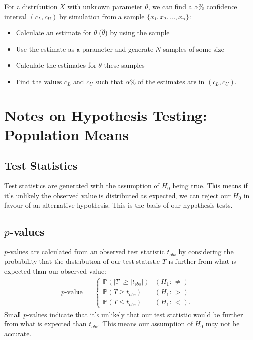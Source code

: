 \documentclass[a4paper, 12pt, twoside]{article}
\begin{document}
For a distribution $X$ with unknown parameter $\theta$, we can
find a $\alpha\%$ confidence interval $(c_L, c_U)$ by simulation from
a sample $\{x_1, x_2, \ldots, x_n\}$:

\begin{itemize}
    \item Calculate an estimate for $\theta$ ($\hat\theta$) by using the
          sample
    \item Use the estimate as a parameter and generate $N$ samples of
          some size
    \item Calculate the estimates for $\theta$ these samples
    \item Find the values $c_L$ and $c_U$ such that $\alpha\%$ of
          the estimates are in $(c_L, c_U)$.
\end{itemize}

\newpage

\section{Notes on Hypothesis Testing: Population Means}

\subsection{Test Statistics}

Test statistics are generated with the assumption of $H_0$ being true.
This means if it's unlikely the observed value is distributed as
expected, we can reject our $H_0$ in favour of an alternative
hypothesis. This is the basis of our hypothesis tests.

\subsection{$p$-values}

$p$-values are calculated from an observed test statistic $t_{obs}$
by considering the probability that the distribution of our
test statistic $T$ is further from what is expected than our observed
value:
\begin{align*}
    p\text{-value } = \begin{cases}
        \mathbb{P}(|T| \geq |t_{obs}|) & (H_1 : \, \neq) \\
        \mathbb{P}(T \geq t_{obs})     & (H_1 : \, >)    \\
        \mathbb{P}(T \leq t_{obs})     & (H_1 : \, <).
    \end{cases}
\end{align*}
Small $p$-values indicate that it's unlikely that our
test statistic would be further from what is expected than
$t_{obs}$. This means our assumption of $H_0$ may not be
accurate.
\end{document}
